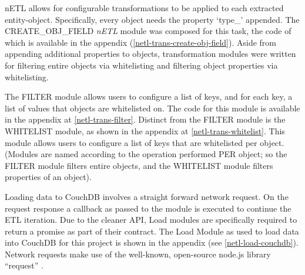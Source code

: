 nETL allows for configurable transformations to be applied to each extracted entity-object. Specifically, every object needs the property `type_' appended. The CREATE\_OBJ\_FIELD \textit{nETL} module was composed for this task, the code of which is available in the appendix (\ref{netl-trans-create-obj-field}). Aside from appending additional properties to objects, transformation modules were written for filtering entire objects via whitelisting and filtering object properties via whitelisting.

The FILTER module allows users to configure a list of keys, and for each key, a list of values that objects are whitelisted on. The code for this module is available in the appendix at \ref{netl-trans-filter}. Distinct from the FILTER module is the WHITELIST module, as shown in the appendix at \ref{netl-trans-whitelist}. This module allows users to configure a list of keys that are whitelisted per object. (Modules are named according to the operation performed PER object; so the FILTER module filters entire objects, and the WHITELIST module filters properties of an object).

Loading data to CouchDB involves a straight forward network request. On the request response a callback as passed to the module is executed to continue the ETL iteration. Due to the cleaner API, Load modules are specifically required to return a promise as part of their contract. The Load Module as used to load data into CouchDB for this project is shown in the appendix (see \ref{netl-load-couchdb}). Network requests make use of the well-known, open-source node.js library ``request'' \cite{request-lib}.